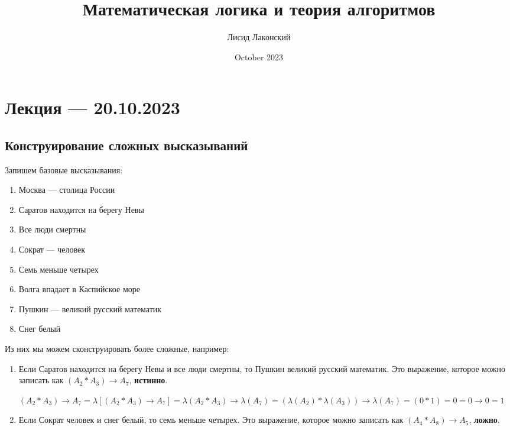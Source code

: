 \documentclass{article}
\title{Математическая логика и теория алгоритмов}
\author{Лисид Лаконский}
\date{October 2023}
\begin{document}
\raggedright

\maketitle

\tableofcontents
\pagebreak

\section{Лекция — 20.10.2023}

\subsection{Конструирование сложных высказываний}

Запишем базовые высказывания:

\begin{multicols}{2}
\begin{enumerate}
    \item Москва — столица России
    \item Саратов находится на берегу Невы
    \item Все люди смертны
    \item Сократ — человек
    \item Семь меньше четырех
    \item Волга впадает в Каспийское море
    \item Пушкин — великий русский математик
    \item Снег белый
\end{enumerate}
\end{multicols}

Из них мы можем сконструировать более сложные, например:

\begin{enumerate}
    \item Если Саратов находится на берегу Невы и все люди смертны, то Пушкин великий русский математик. Это выражение, которое можно записать как $(A_2 * A_3) \rightarrow A_7$, \textbf{истинно}.

    $(A_2 * A_3) \rightarrow A_7 = \lambda [(A_2 * A_3) \rightarrow A_7] = \lambda(A_2 * A_3) \rightarrow \lambda (A_7) = (\lambda (A_2) * \lambda(A_3)) \rightarrow \lambda(A_7) = (0 * 1) = 0 = 0 \rightarrow 0 = 1$
    \item Если Сократ человек и снег белый, то семь меньше четырех. Это выражение, которое можно записать как $(A_4 * A_8) \rightarrow A_5$, \textbf{ложно}.
\end{enumerate}
\end{document}

